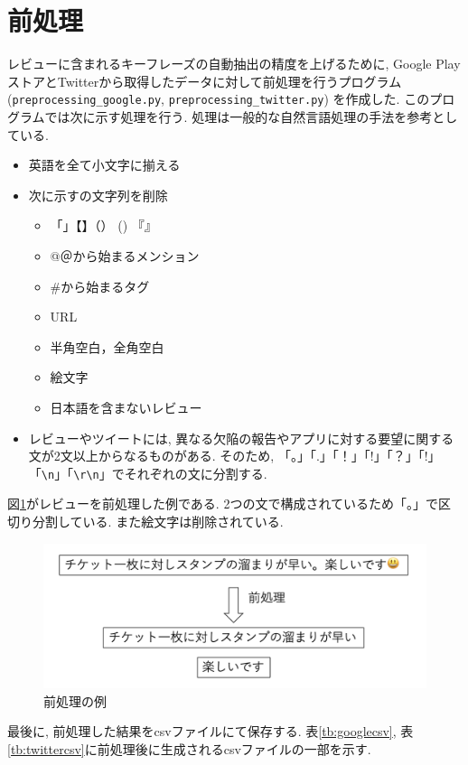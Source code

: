\section{前処理}\label{preprocessing}
レビューに含まれるキーフレーズの自動抽出の精度を上げるために, Google PlayストアとTwitterから取得したデータに対して前処理を行うプログラム (\verb|preprocessing_google.py|, \verb|preprocessing_twitter.py|) を作成した. このプログラムでは次に示す処理を行う. 処理は一般的な自然言語処理の手法を参考としている. 
\begin{itemize}
  \item 英語を全て小文字に揃える
  \item 次に示すの文字列を削除
    \begin{itemize}
      \item 「」【】（） () 『』
      \item @＠から始まるメンション
      \item \#から始まるタグ
      \item URL
      \item 半角空白，全角空白
      \item 絵文字
      \item 日本語を含まないレビュー
    \end{itemize}
  \item レビューやツイートには, 異なる欠陥の報告やアプリに対する要望に関する文が2文以上からなるものがある. そのため, 「。」「.」「！」「!」「？」「!」「\verb|\n|」「\verb|\r\n|」でそれぞれの文に分割する. 
\end{itemize}
図\ref{fig:preprocessing}がレビューを前処理した例である. 2つの文で構成されているため「。」で区切り分割している. また絵文字は削除されている. 

\begin{figure}[H]
 \centering
 \includegraphics[scale=0.5]
      {contents/images/preprocessing.png}
 \caption{前処理の例\label{fig:preprocessing}}
\end{figure}

最後に, 前処理した結果をcsvファイルにて保存する. 
表\ref{tb:googlecsv}, 表\ref{tb:twittercsv}に前処理後に生成されるcsvファイルの一部を示す. 

